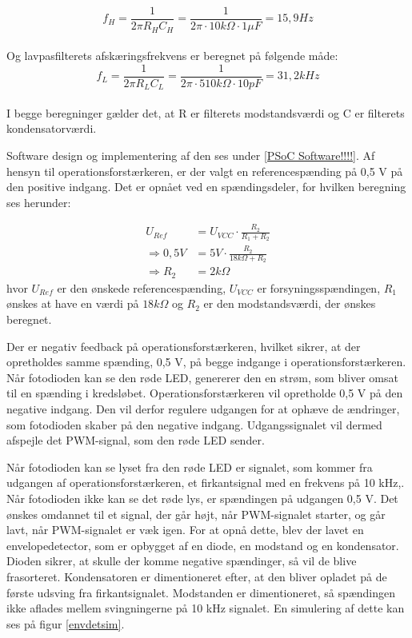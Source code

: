 \begin{equation}
	f_{H}=\frac{1}{2\pi R_{H} C_{H}}=\frac{1}{2\pi \cdot 10k\Omega \cdot 1\mu F}=15,9Hz
	\label{cutoffhojpas}
\end{equation} \\

Og lavpasfilterets afskæringsfrekvens er beregnet på følgende måde: \\

\begin{equation}
	f_{L} = \frac{1}{2\pi R_{L} C_{L}}=\frac{1}{2\pi \cdot 510k\Omega \cdot 10pF}=31,2kHz
	\label{cutofflavpas}
\end{equation} \\

I begge beregninger gælder det, at R er filterets modstandsværdi og C er filterets kondensatorværdi. 

Software design og implementering af den ses under \ref{PSoC Software!!!!}. Af hensyn til operationsforstærkeren, er der valgt en referencespænding på 0,5 V på den positive indgang. Det er opnået ved en spændingsdeler, for hvilken beregning ses herunder: 

\begin{align}
	U_{Ref}&=U_{VCC} \cdot \frac{R_{2}}{R_{1}+R_{2}} \\ 	\nonumber
	\Rightarrow 0,5V &= 5V \cdot \frac{R_{2}}{18k\Omega + R_{2}} \\	
	\Rightarrow R_{2}&=2k\Omega		\nonumber
\end{align}
\noindent hvor $U_{Ref}$ er den ønskede referencespænding, $U_{VCC}$ er forsyningsspændingen, $R_{1}$ ønskes at have en værdi på $18k\Omega$ og $R_{2}$ er den modstandsværdi, der ønskes beregnet. 

Der er negativ feedback på operationsforstærkeren, hvilket sikrer, at der opretholdes samme spænding, 0,5 V, på begge indgange i operationsforstærkeren. Når fotodioden kan se den røde LED, genererer den en strøm, som bliver omsat til en spænding i kredsløbet. Operationsforstærkeren vil opretholde 0,5 V på den negative indgang. Den vil derfor regulere udgangen for at ophæve de ændringer, som fotodioden skaber på den negative indgang. Udgangssignalet vil dermed afspejle det PWM-signal, som den røde LED sender.  

Når fotodioden kan se lyset fra den røde LED er signalet, som kommer fra udgangen af operationsforstærkeren, et firkantsignal med en frekvens på 10 kHz,. Når fotodioden ikke kan se det røde lys, er spændingen på udgangen 0,5 V. Det ønskes omdannet til et signal, der går højt, når PWM-signalet starter, og går lavt, når PWM-signalet er væk igen. For at opnå dette, blev der lavet en envelopedetector, som er opbygget af en diode, en modstand og en kondensator. Dioden sikrer, at skulle der komme negative spændinger, så vil de blive frasorteret. Kondensatoren er dimentioneret efter, at den bliver opladet på de første udsving fra firkantsignalet. Modstanden er dimentioneret, så spændingen ikke aflades mellem svingningerne på 10 kHz signalet. En simulering af dette kan ses på figur \ref{envdetsim}. 

